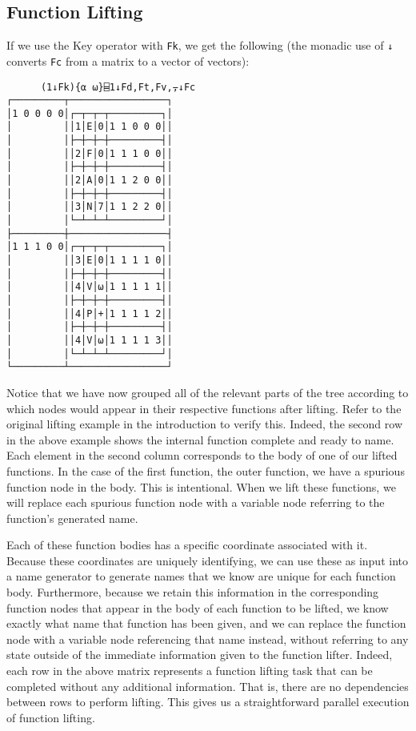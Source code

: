 \documentclass[numbers,9pt]{sigplanconf}
\begin{document}
\subsection{Function Lifting}

If we use the Key operator with \verb;Fk;, we get the following (the monadic
use of \verb;↓; converts \verb;Fc; from a matrix to a vector of vectors):

\begin{verbatim}
      (1↓Fk){⍺ ⍵}⌸1↓Fd,Ft,Fv,⍪↓Fc
┌─────────┬─────────────────┐
│1 0 0 0 0│┌─┬─┬─┬─────────┐│
│         ││1│E│0│1 1 0 0 0││
│         │├─┼─┼─┼─────────┤│
│         ││2│F│0│1 1 1 0 0││
│         │├─┼─┼─┼─────────┤│
│         ││2│A│0│1 1 2 0 0││
│         │├─┼─┼─┼─────────┤│
│         ││3│N│7│1 1 2 2 0││
│         │└─┴─┴─┴─────────┘│
├─────────┼─────────────────┤
│1 1 1 0 0│┌─┬─┬─┬─────────┐│
│         ││3│E│0│1 1 1 1 0││
│         │├─┼─┼─┼─────────┤│
│         ││4│V│⍵│1 1 1 1 1││
│         │├─┼─┼─┼─────────┤│
│         ││4│P│+│1 1 1 1 2││
│         │├─┼─┼─┼─────────┤│
│         ││4│V│⍵│1 1 1 1 3││
│         │└─┴─┴─┴─────────┘│
└─────────┴─────────────────┘
\end{verbatim}

Notice that we have now grouped all of the relevant parts of the
tree according to which nodes would appear in their respective
functions after lifting. Refer to the original lifting example in
the introduction to verify this. Indeed, the second row in the
above example shows the internal function complete and ready to
name. Each element in the second column corresponds to the body of
one of our lifted functions. In the case of the first function, the
outer function, we have a spurious function node in the body. This
is intentional. When we lift these functions, we will replace
each spurious function node with a variable node referring to the
function’s generated name.

Each of these function bodies has a specific coordinate associated
with it. Because these coordinates are uniquely identifying, we can
use these as input into a name generator to generate names that we
know are unique for each function body. Furthermore, because we
retain this information in the corresponding function nodes that
appear in the body of each function to be lifted, we know exactly
what name that function has been given, and we can replace the
function node with a variable node referencing that name instead,
without referring to any state outside of the immediate information
given to the function lifter. Indeed, each row in the above matrix
represents a function lifting task that can be completed without any
additional information. That is, there are no dependencies between
rows to perform lifting. This gives us a straightforward parallel
execution of function lifting.
\end{document}
